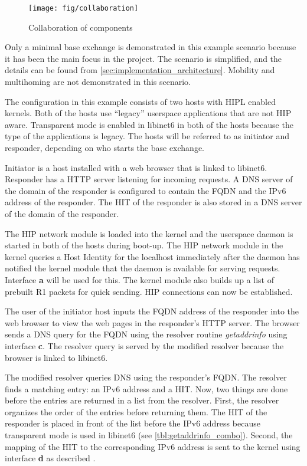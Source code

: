 \begin{figure}[hbt]
 \centering
 \texttt{[image: fig/collaboration]}
 \caption{Collaboration of components}
 \label{fig:collaboration_architecture}
\end{figure}

Only a minimal base exchange is demonstrated in this example scenario
because it has been the main focus in the project. The scenario is
simplified, and the details can be found from
\autoref{sec:implementation_architecture}. Mobility and multihoming
are not demonstrated in this scenario.

The configuration in this example consists of two hosts with HIPL
enabled kernels. Both of the hosts use ``legacy'' userspace
applications that are not HIP aware. Transparent mode is enabled in
libinet6 in both of the hosts because the type of the applications is
legacy. The hosts will be referred to as initiator and responder,
depending on who starts the base exchange.

Initiator is a host installed with a web browser that is linked to
libinet6. Responder has a HTTP server listening for incoming
requests. A DNS server of the domain of the responder is configured to
contain the FQDN and the IPv6 address of the responder. The HIT of the
responder is also stored in a DNS server of the domain of the
responder.

The HIP network module is loaded into the kernel and the userspace
daemon is started in both of the hosts during boot-up. The HIP network
module in the kernel queries a Host Identity for the localhost
immediately after the daemon has notified the kernel module that the
daemon is available for serving requests. Interface \textbf{a} will be
used for this. The kernel module also builds up a list of prebuilt R1
packets for quick sending. HIP connections can now be established.

The user of the initiator host inputs the FQDN address of the
responder into the web browser to view the web pages in the
responder's HTTP server. The browser sends a DNS query for the FQDN
using the resolver routine \textit{getaddrinfo} using interface
\textbf{c}. The resolver query is served by the modified resolver
because the browser is linked to libinet6.

The modified resolver queries DNS using the responder's FQDN. The
resolver finds a matching entry: an IPv6 address and a HIT. Now, two
things are done before the entries are returned in a list from the
resolver. First, the resolver organizes the order of the entries
before returning them. The HIT of the responder is placed in front of
the list before the IPv6 address because transparent mode is used in
libinet6 (see \autoref{tbl:getaddrinfo_combo}). Second, the mapping of
the HIT to the corresponding IPv6 address is sent to the kernel using
interface \textbf{d} as described
.

